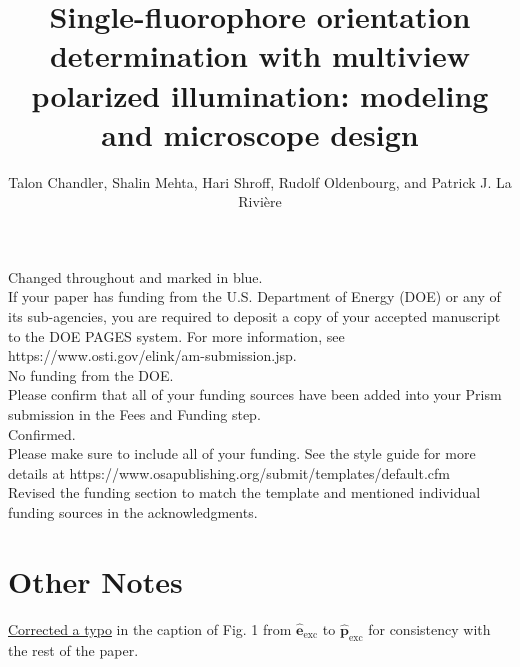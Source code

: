 \documentclass[10pt]{article}
\providecommand{\mb}[1]{\mathbf{#1}}
\begin{document}
Changed throughout and marked in blue.\\

{\color{OE} If your paper has funding from the U.S. Department of Energy (DOE)
  or any of its sub-agencies, you are required to deposit a copy of your
  accepted manuscript to the DOE PAGES system. For more information, see
  https://www.osti.gov/elink/am-submission.jsp.}\\

No funding from the DOE.\\

{\color{OE} Please confirm that all of your funding sources have been added
  into your Prism submission in the Fees and Funding step.}\\

Confirmed. \\

{\color{OE} Please make sure to include all of your funding. See the style
  guide for more details at
  https://www.osapublishing.org/submit/templates/default.cfm}\\

Revised the funding section to match the template and mentioned individual funding
sources in the acknowledgments.

\section*{Other Notes}

\hyperlink{typo}{\color{urlblue} Corrected a typo} in the caption of Fig. 1 from $\hat{\mb{e}}_{\text{exc}}$ to
$\hat{\mb{p}}_{\text{exc}}$ for consistency with the rest of the paper. 

\pagebreak

\title{Single-fluorophore orientation determination with multiview polarized
  illumination: modeling and microscope design}

\author{Talon Chandler, Shalin Mehta, Hari
  Shroff, Rudolf Oldenbourg, and Patrick J. La
  Rivi\`ere}
\address{University of Chicago, Department of Radiology, Chicago, Illinois 60637, USA\\
  Marine Biological Laboratory, Bell Center, Woods Hole, Massachusetts 02543, USA\\
  (present address) Chan Zuckerberg Biohub, San Francisco, California 94158, USA\\
  Section on High Resolution Optical Imaging, National Institute
  of Biomedical Imaging and Bioengineering, National Institutes of Health,
  Bethesda, Maryland 20892, USA\\
  Marine Biological Laboratory, Whitman Center, Woods Hole,
  Massachusetts 02543, USA\\
  Brown University, Department of Physics, Providence, Rhode
  Island 02912, USA}
\end{document}
